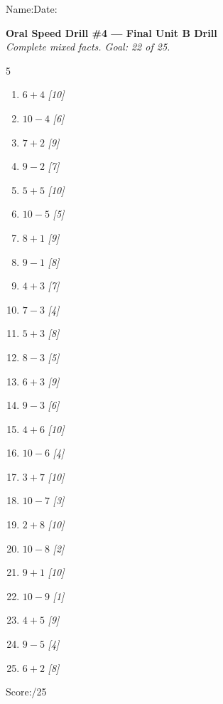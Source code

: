 \documentclass[12pt, letterpaper]{article}
\begin{document}

{\small Name:\ansblanklg \hfill Date:\ansblank}
\goldrule

\begin{mdframed}[backgroundcolor=sd-gold!15,linecolor=sd-gold,linewidth=1.5pt,roundcorner=4pt,
  innerleftmargin=10pt,innerrightmargin=10pt,innertopmargin=8pt,innerbottommargin=8pt]
\textbf{\color{sd-gold}Oral Speed Drill \#4 — Final Unit B Drill}\\[4pt]
\textit{Complete mixed facts. Goal: 22 of 25.}\\[6pt]
\begin{multicols}{5}
\begin{enumerate}[leftmargin=*,label=\small\arabic*.,itemsep=1pt]
  \item $6+4$ \textit{[10]}  \item $10-4$ \textit{[6]}   \item $7+2$ \textit{[9]}
  \item $9-2$ \textit{[7]}   \item $5+5$ \textit{[10]}   \item $10-5$ \textit{[5]}
  \item $8+1$ \textit{[9]}   \item $9-1$ \textit{[8]}    \item $4+3$ \textit{[7]}
  \item $7-3$ \textit{[4]}   \item $5+3$ \textit{[8]}    \item $8-3$ \textit{[5]}
  \item $6+3$ \textit{[9]}   \item $9-3$ \textit{[6]}    \item $4+6$ \textit{[10]}
  \item $10-6$ \textit{[4]}  \item $3+7$ \textit{[10]}   \item $10-7$ \textit{[3]}
  \item $2+8$ \textit{[10]}  \item $10-8$ \textit{[2]}   \item $9+1$ \textit{[10]}
  \item $10-9$ \textit{[1]}  \item $4+5$ \textit{[9]}    \item $9-5$ \textit{[4]}
  \item $6+2$ \textit{[8]}
\end{enumerate}
\end{multicols}
\noindent Score:\underline{\hspace{1.5cm}}/25
\end{mdframed}
\end{document}
